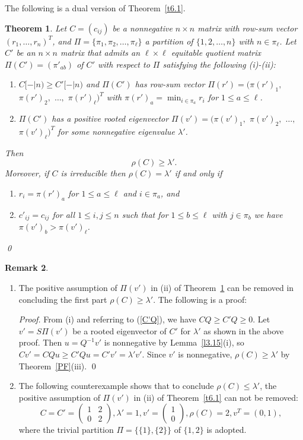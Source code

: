 \documentclass[final,3p, times, 12pt]{elsarticle}
\theoremstyle{plain}
\newtheorem{thm}{Theorem}[section]
\theoremstyle{definition}
\newtheorem{rem}[thm]{Remark}
\theoremstyle{remark}
\numberwithin{equation}{section}
\begin{document}
The following is a dual version of Theorem~\ref{t6.1}.


\begin{thm}\label{t6.2}
Let $C=(c_{ij})$ be a nonnegative $n\times n$ matrix with row-sum vector $(r_1,\ldots,r_n)^T$,  and
 $\Pi=\{\pi_1, \pi_2, \ldots, \pi_\ell\}$ a partition of $\{1, 2, \ldots, n\}$ with $n\in \pi_\ell$.
Let $C'$ be an $n\times n$ matrix that admits
  an $\ell\times \ell$ equitable quotient matrix $\Pi(C')=(\pi'_{ab})$ of $C'$  with respect to $\Pi$ satisfying the following
(i)-(ii):
\begin{enumerate}
\item[(i)] $C[-|n)\geq C'[-|n)$ and
$\Pi(C')$ has row-sum vector  $\Pi(r')=$$(\pi(r')_1,$ $\pi(r')_2,$ $\ldots,$ $\pi(r')_\ell)^T$ with $\pi(r')_a=\min_{i\in \pi_a}r_i$ for $1\leq a\leq \ell$.
\item[(ii)] $\Pi(C')$ has a positive rooted eigenvector $\Pi(v')=$$(\pi(v')_1,$ $\pi(v')_2,$ $\ldots,$ $\pi(v')_\ell)^T$ for some nonnegative eigenvalue $\lambda'$.
\end{enumerate}
Then
\begin{equation}
\rho(C)\geq \lambda'.
\end{equation} Moreover, if $C$ is irreducible then
$\rho(C)= \lambda'$ if and only if
\begin{enumerate}
\item[(a)] $r_i=\pi(r')_a$ \qquad for $1\leq a\leq \ell$ and $i\in \pi_a$, and
\item[(b)] $c'_{ij}=c_{ij}$ \qquad for all $1\leq i, j\leq n$ such that for $1\leq b\leq \ell$ with $j\in \pi_b$ we have  $\pi(v')_b>\pi(v')_\ell$.
\end{enumerate}\qed
\end{thm}


\begin{rem}
\begin{enumerate}
\item[(i)] The positive assumption of $\Pi(v')$ in (ii)  of  Theorem~\ref{t6.2} can be removed in concluding the first part $\rho(C)\geq \lambda'$.
The following is a proof:

{\it Proof.} From (i) and referring to (\ref{C'Q}), we have $CQ\geq C'Q\geq 0$.
Let $v'=S\Pi(v')$ be a rooted eigenvector of $C'$ for $\lambda'$ as shown in the above proof.
Then $u=Q^{-1}v'$ is nonnegative by Lemma~\ref{l3.15}(i), so
$Cv'=CQu\geq C'Qu= C'v'=\lambda'v'.$
Since $v'$ is nonnegative,  $\rho(C)\geq \lambda'$ by Theorem~\ref{PF}(iii). \qed

\item[(ii)] The following counterexample shows that to conclude $\rho(C)\leq \lambda'$, the positive assumption of $\Pi(v')$ in (ii)  of  Theorem~\ref{t6.1} can not  be removed:
    $$C=C'=\begin{pmatrix}1& 2\\ 0 & 2\end{pmatrix}, \lambda'=1, v'=\begin{pmatrix} 1\\ 0\end{pmatrix}, \rho(C)=2, v^T=(0, 1),$$
    where the trivial partition $\Pi=\{\{1\}, \{2\}\}$ of $\{1, 2\}$ is adopted.
\end{enumerate}
\end{rem}
\end{document}
